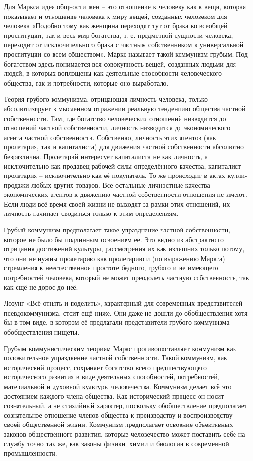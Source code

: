 \documentclass[../main]{subfiles}
\begin{document}
Для Маркса идея общности жен – это отношение к человеку как к вещи, которая показывает и отношение человека к миру вещей, созданных человеком для человека «Подобно тому как женщина переходит тут от брака ко всеобщей проституции, так и весь мир богатства, т. е. предметной сущности человека, переходит от исключительного брака с частным собственником к универсальной проституции со всем обществом». Маркс называет такой коммунизм грубым. Под богатством здесь понимается вся совокупность вещей, созданных людьми для людей, в которых воплощены как деятельные способности человеческого общества, так и потребности, которые оно выработало.

Теория грубого коммунизма, отрицающая личность человека, только абсолютизирует в мысленном отражении реальную тенденцию общества частной собственности. Там, где богатство человеческих отношений низводится до отношений частной собственности, личность низводится до экономического агента частной собственности. Собственно, личность этих агентов (как пролетария, так и капиталиста) для движения частной собственности абсолютно безразлична. Пролетарий интересует капиталиста не как личность, а исключительно как продавец рабочей силы определённого качества, капиталист пролетария – исключительно как её покупатель. То же происходит в актах купли-продажи любых других товаров. Все остальные личностные качества экономических агентов к движению частной собственности отношения не имеют. Если люди всё время своей жизни не выходят за рамки этих отношений, их личность начинает сводиться только к этим определениям.

Грубый коммунизм предполагает такое упразднение частной собственности, которое не было бы подлинным освоением ее. Это видно из абстрактного отрицания достижений культуры, рассмотрения их как излишних только потому, что они не нужны пролетарию как пролетарию и (по выражению Маркса) стремления к неестественной простоте бедного, грубого и не имеющего потребностей человека, который не может преодолеть частную собственность, так как ещё не дорос до неё.

Лозунг «Всё отнять и поделить», характерный для современных представителей псевдокоммунизма, стоит ещё ниже. Они даже не дошли до обобществления хотя бы в том виде, в котором её предлагали представители грубого коммунизма – обобществления нищеты.

Грубым коммунистическим теориям Маркс противопоставляет коммунизм как положительное упразднение частной собственности. Такой коммунизм, как исторический процесс, сохраняет богатство всего предшествующего исторического развития в виде деятельных способностей, потребностей, материальной и духовной культуры человечества. Коммунизм делает всё это достоянием каждого члена общества. Как исторический процесс он носит сознательный, а не стихийный характер, поскольку обобществление предполагает сознательное отношение членов общества к производству и воспроизводству своей общественной жизни. Коммунизм предполагает освоение объективных законов общественного развития, которые человечество может поставить себе на службу точно так же, как законы физики, химии и биологии в современной промышленности.
\end{document}
